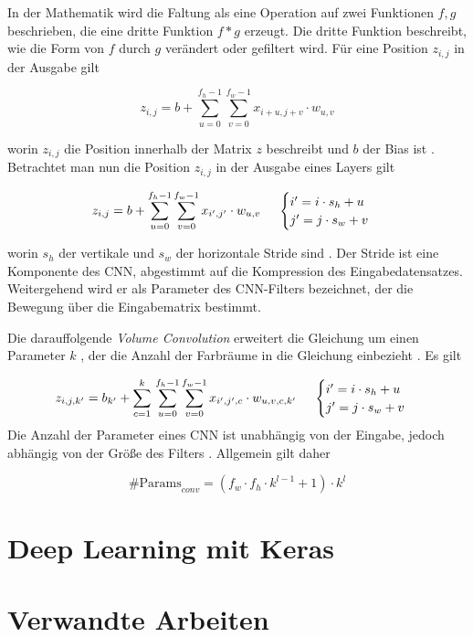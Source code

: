 In der Mathematik wird die Faltung als eine Operation auf zwei Funktionen $f,g$ beschrieben, die eine dritte Funktion $f * g$ erzeugt. Die dritte Funktion beschreibt, wie die Form von $f$ durch $g$ verändert oder gefiltert wird. Für eine Position $ z_{ i,j } $ in der Ausgabe gilt

\begin{equation}
	z_{i,j}=b+\sum_{u=0}^{f_{h}-1}\sum_{v=0}^{f_{w}-1}{x_{i+u,j+v}\cdot w_{u,v}}
\end{equation}

worin $z_{i,j}$ die Position innerhalb der Matrix $z$ beschreibt und $b$ der \gls{Bias} ist \cite[6]{karl2020}. Betrachtet man nun die Position $z_{i,j}$ in der Ausgabe eines Layers gilt 

\begin{equation}
	z_{i,j}=b+\sum_{u=0}^{f_{h}-1}\sum_{v=0}^{f_{w}-1}{x_{i',j'}\cdot w_{u,v}}\text{  \space\space\space    } \begin{cases}
	i' = i \cdot s_{h} + u \\ j' = j \cdot s_{w} + v 
\end{cases}
\end{equation}

worin $s_h$ der vertikale und $s_w$ der horizontale Stride sind \cite[13\psq]{karl2020}. Der Stride ist eine Komponente des \ac{CNN}, abgestimmt auf die Kompression des Eingabedatensatzes. Weitergehend wird er als Parameter des \ac{CNN}-Filters bezeichnet, der die Bewegung  über die Eingabematrix bestimmt.

Die darauffolgende \emph{Volume Convolution} erweitert die Gleichung um einen Parameter $k$ , der die Anzahl der Farbräume in die Gleichung einbezieht \cites[25]{karl2020}[365]{Géron2017}. Es gilt
	
\begin{equation}
	z_{i,j,k'}=b_{k'}+\sum_{c=1}^k{}\sum_{u=0}^{f_{h}-1}\sum_{v=0}^{f_{w}-1}{x_{i',j',c}\cdot w_{u,v,c,k'}}\text{  \space\space\space    } \begin{cases}
	i' = i \cdot s_{h} + u \\ j' = j \cdot s_{w} + v 
\end{cases}
\end{equation}
Die Anzahl der Parameter eines \ac{CNN} ist unabhängig von der Eingabe, jedoch abhängig von der Größe des Filters \cite[28]{karl2020}. Allgemein gilt daher 

\begin{equation}
	\text{\#{ }Params}_{conv} = (f_{w} \cdot f_{h} \cdot k^{l-1} + 1) \cdot k^l
\end{equation}

\section{Deep Learning mit Keras}

\section{Verwandte Arbeiten}
